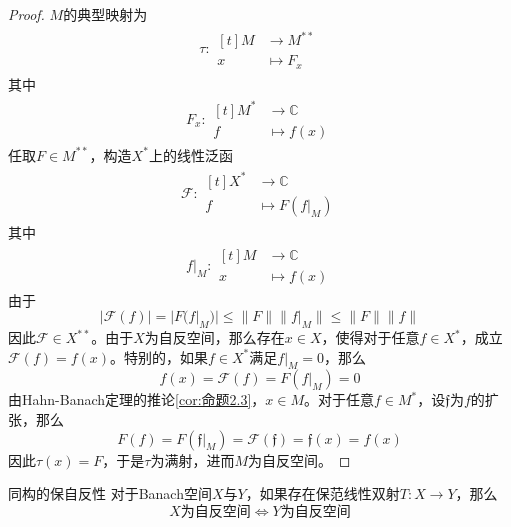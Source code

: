 \documentclass[lang = cn, scheme = chinese, thmcnt = section]{elegantbook}
\newcommand{\C}{\mathbb{C}}  		   %
\begin{document}
\begin{proof}
	$M$的典型映射为
	\begin{align*}
		\tau:\begin{aligned}[t]
			M&\longrightarrow M^{**}\\
			x&\longmapsto F_x
		\end{aligned}
	\end{align*}
	其中
	\begin{align*}
		F_x:\begin{aligned}[t]
			M^*&\longrightarrow \C\\
			f&\longmapsto f(x)
		\end{aligned}
	\end{align*}
	任取$F\in M^{**}$，构造$X^*$上的线性泛函
	\begin{align*}
		\mathscr{F}:\begin{aligned}[t]
			X^*&\longrightarrow \C\\
			f&\longmapsto F(f|_{M})
		\end{aligned}
	\end{align*}
	其中
	\begin{align*}
		f|_{M}:\begin{aligned}[t]
			M&\longrightarrow \C\\
			x&\longmapsto f(x)
		\end{aligned}
	\end{align*}
	由于
	$$
	|\mathscr{F}(f)|
	=|F(f|_{M})|
	\le \|F\|\|f|_{M}\|
	\le \|F\|\|f\|
	$$
	因此$\mathscr{F}\in X^{**}$。由于$X$为自反空间，那么存在$x\in X$，使得对于任意$f\in X^*$，成立$\mathscr{F}(f)=f(x)$。特别的，如果$f\in X^*$满足$f|_M=0$，那么
	$$
	f(x)=\mathscr{F}(f)=F(f|_M)=0
	$$
	由Hahn-Banach定理的推论\ref{cor:命题2.3}，$x\in M$。对于任意$f\in M^*$，设$\mathfrak{f}$为$f$的扩张，那么
	$$
	F(f)=F(\mathfrak{f}|_M)=\mathscr{F}(\mathfrak{f})=\mathfrak{f}(x)=f(x)
	$$
	因此$\tau(x)=F$，于是$\tau$为满射，进而$M$为自反空间。
\end{proof}

\begin{theorem}{}{同构的保自反性}
	对于Banach空间$X$与$Y$，如果存在保范线性双射$T:X\to Y$，那么
	$$
	X\text{为自反空间}\iff 
	Y\text{为自反空间}
	$$
\end{theorem}
\end{document}
